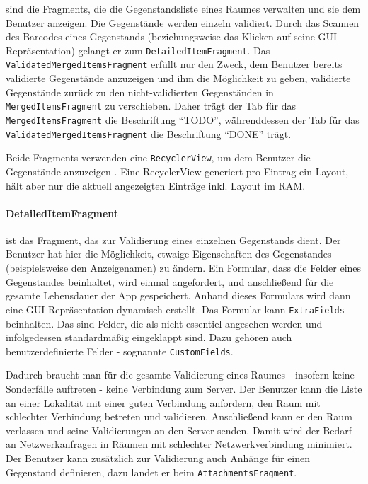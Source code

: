 sind die Fragments, die die Gegenstandsliste eines Raumes verwalten und
sie dem Benutzer anzeigen. Die Gegenstände werden einzeln validiert.
Durch das Scannen des Barcodes eines Gegenstands (beziehungsweise das
Klicken auf seine GUI-Repräsentation) gelangt er zum
\texttt{DetailedItemFragment}. Das \texttt{ValidatedMergedItemsFragment}
erfüllt nur den Zweck, dem Benutzer bereits validierte Gegenstände
anzuzeigen und ihm die Möglichkeit zu geben, validierte Gegenstände
zurück zu den nicht-validierten Gegenständen in
\texttt{MergedItemsFragment} zu verschieben. Daher trägt der Tab für das
\texttt{MergedItemsFragment} die Beschriftung ``TODO'', währenddessen
der Tab für das \texttt{ValidatedMergedItemsFragment} die Beschriftung
``DONE'' trägt.

Beide Fragments verwenden eine \texttt{RecyclerView}, um dem Benutzer
die Gegenstände anzuzeigen \cite{recyclerview}. Eine RecyclerView
generiert pro Eintrag ein Layout, hält aber nur die aktuell angezeigten
Einträge inkl. Layout im RAM.

\hypertarget{detaileditemfragment}{%
\paragraph{DetailedItemFragment}\label{detaileditemfragment}}

ist das Fragment, das zur Validierung eines einzelnen Gegenstands dient.
Der Benutzer hat hier die Möglichkeit, etwaige Eigenschaften des
Gegenstandes (beispielsweise den Anzeigenamen) zu ändern. Ein Formular,
dass die Felder eines Gegenstandes beinhaltet, wird einmal angefordert,
und anschließend für die gesamte Lebensdauer der App gespeichert. Anhand
dieses Formulars wird dann eine GUI-Repräsentation dynamisch erstellt.
Das Formular kann \texttt{ExtraFields} beinhalten. Das sind Felder, die
als nicht essentiel angesehen werden und infolgedessen standardmäßig
eingeklappt sind. Dazu gehören auch benutzerdefinierte Felder -
sognannte \texttt{CustomFields}.

Dadurch braucht man für die gesamte Validierung eines Raumes - insofern
keine Sonderfälle auftreten - keine Verbindung zum Server. Der Benutzer
kann die Liste an einer Lokalität mit einer guten Verbindung anfordern,
den Raum mit schlechter Verbindung betreten und validieren. Anschließend
kann er den Raum verlassen und seine Validierungen an den Server senden.
Damit wird der Bedarf an Netzwerkanfragen in Räumen mit schlechter
Netzwerkverbindung minimiert. Der Benutzer kann zusätzlich zur
Validierung auch Anhänge für einen Gegenstand definieren, dazu landet er
beim \texttt{AttachmentsFragment}.

